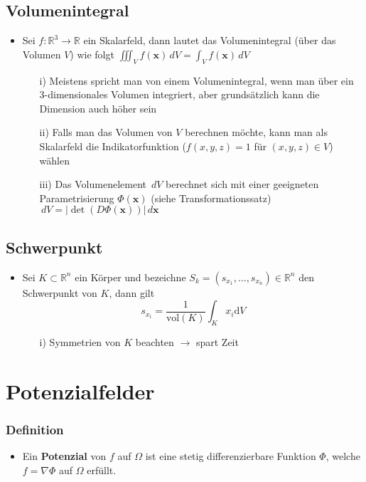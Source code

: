 \documentclass[a3paper, 11pt, landscape]{scrartcl}
\newcommand{\diff}{\,d}
\begin{document}
\begin{multicols*}{3}
	\subsection{Volumenintegral}
					\begin{itemize}
					    \item Sei $f: \mathbb{R}^3 \rightarrow \mathbb{R}$ ein Skalarfeld, dann lautet das Volumenintegral (über das Volumen $V$) wie folgt $\iiint_V f(\textbf{x}) \diff V = \int_V f(\textbf{x}) \diff V $
					\begin{itemize} 
						\item[i)] Meistens spricht man von einem Volumenintegral, wenn man über ein 3-dimensionales Volumen integriert, aber grundsätzlich kann die Dimension auch höher sein
						\item[ii)] Falls man das Volumen von $V$ berechnen möchte, kann man als Skalarfeld die Indikatorfunktion ($f(x, y, z) = 1$ für $(x, y, z) \in V$) wählen
						\item[iii)] Das Volumenelement $\diff V$ berechnet sich mit einer geeigneten Parametrisierung $\Phi(\textbf{x})$ (siehe Transformationssatz)
						$ \diff V = \vert \det(D\Phi(\textbf{x}))\vert \diff \textbf{x}$
					\end{itemize}
					\end{itemize}
	\subsection{Schwerpunkt}
					\begin{itemize}
					    \item Sei $K \subset \mathbb{R}^n$ ein Körper und bezeichne $S_k=(s_{x_1}, \dots, s_{x_n}) \in \mathbb{R}^n$ den Schwerpunkt von $K$, dann gilt
					\begin{equation*}	s_{x_i}=\frac{1}{\text{vol}(K)}\int_{K}x_i \text{d}V
					\end{equation*}
					\begin{itemize}
						\item[i)] Symmetrien von $K$ beachten $\rightarrow$ spart Zeit
					\end{itemize}
					\end{itemize}
					
					
					
	
	\section{Potenzialfelder}
	\subsubsection{Definition}
	\begin{itemize}
	    \item Ein \textbf{Potenzial} von $f$ auf $\Omega$ ist eine stetig differenzierbare Funktion $\Phi$, welche $f=\nabla \Phi$ auf $\Omega$ erfüllt.
	\end{itemize}

\end{multicols*}
\end{document}
